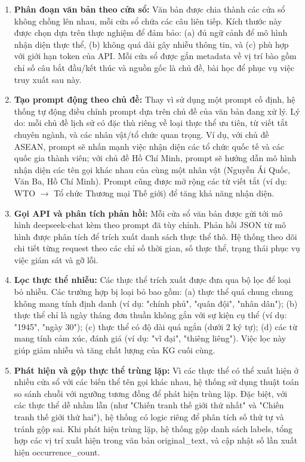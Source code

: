 \begin{enumerate}
    \item \textbf{Phân đoạn văn bản theo cửa sổ:} Văn bản được chia thành các cửa sổ không chồng lên nhau, mỗi cửa sổ chứa các câu liên tiếp. Kích thước này được chọn dựa trên thực nghiệm để đảm bảo: (a) đủ ngữ cảnh để mô hình nhận diện thực thể, (b) không quá dài gây nhiễu thông tin, và (c) phù hợp với giới hạn token của API. Mỗi cửa sổ được gắn metadata về vị trí bào gồm chỉ số câu bắt đầu/kết thúc và nguồn gốc là chủ đề, bài học để phục vụ việc truy xuất sau này.

    \item \textbf{Tạo prompt động theo chủ đề:} Thay vì sử dụng một prompt cố định, hệ thống tự động điều chỉnh prompt dựa trên chủ đề của văn bản đang xử lý. Lý do: mỗi chủ đề lịch sử có đặc thù riêng về loại thực thể ưu tiên, từ viết tắt chuyên ngành, và các nhân vật/tổ chức quan trọng. Ví dụ, với chủ đề ASEAN, prompt sẽ nhấn mạnh việc nhận diện các tổ chức quốc tế và các quốc gia thành viên; với chủ đề Hồ Chí Minh, prompt sẽ hướng dẫn mô hình nhận diện các tên gọi khác nhau của cùng một nhân vật (Nguyễn Ái Quốc, Văn Ba, Hồ Chí Minh). Prompt cũng được mở rộng các từ viết tắt (ví dụ: WTO $\rightarrow$ Tổ chức Thương mại Thế giới) để tăng khả năng nhận diện.

    \item \textbf{Gọi API và phân tích phản hồi:} Mỗi cửa sổ văn bản được gửi tới mô hình deepseek-chat kèm theo prompt đã tùy chỉnh. Phản hồi JSON từ mô hình được phân tích để trích xuất danh sách thực thể thô. Hệ thống theo dõi chi tiết từng request theo các chỉ số thời gian, số thực thể, trạng thái phục vụ việc giám sát và gỡ lỗi.

    \item \textbf{Lọc thực thể nhiễu:} Các thực thể trích xuất được đưa qua bộ lọc để loại bỏ nhiễu. Các trường hợp bị loại bỏ bao gồm: (a) thực thể quá chung chung không mang tính định danh (ví dụ: "chính phủ", "quân đội", "nhân dân"); (b) thực thể chỉ là ngày tháng đơn thuần không gắn với sự kiện cụ thể (ví dụ: "1945", "ngày 30"); (c) thực thể có độ dài quá ngắn (dưới 2 ký tự); (d) các từ mang tính cảm xúc, đánh giá (ví dụ: "vĩ đại", "thiêng liêng"). Việc lọc này giúp giảm nhiễu và tăng chất lượng của KG cuối cùng.

    \item \textbf{Phát hiện và gộp thực thể trùng lặp:} Vì các thực thể có thể xuất hiện ở nhiều cửa sổ với các biến thể tên gọi khác nhau, hệ thống sử dụng thuật toán so sánh chuỗi với ngưỡng tương đồng để phát hiện trùng lặp. Đặc biệt, với các thực thể dễ nhầm lẫn (như "Chiến tranh thế giới thứ nhất" và "Chiến tranh thế giới thứ hai"), hệ thống có logic riêng để phân tích số thứ tự và tránh gộp sai. Khi phát hiện trùng lặp, hệ thống gộp danh sách labels, tổng hợp các vị trí xuất hiện trong văn bản original\_text, và cập nhật số lần xuất hiện occurrence\_count.


\end{enumerate}
